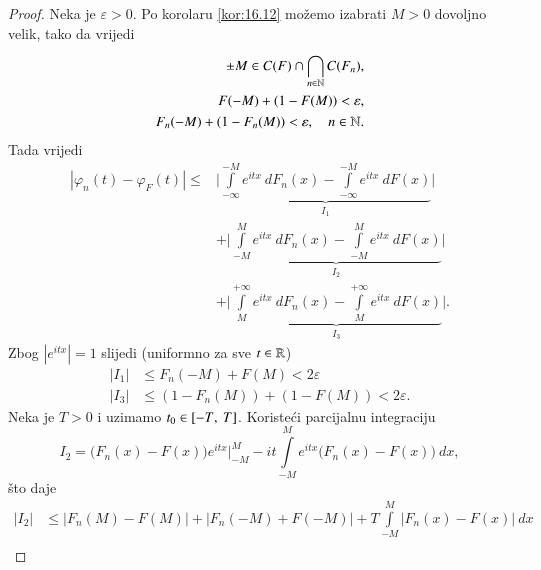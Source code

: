 \begin{proof}
    Neka je $\varepsilon > 0$.
    Po korolaru \ref{kor:16.12} mo\v zemo izabrati $M > 0$ dovoljno velik, tako da vrijedi
    \begin{equation*}
        \begin{aligned}
            \pm M \in C(F) \cap \bigcap\limits_{n \in \mathbb{N}}^{} C(F_n),\\
            F(-M) + (1 - F(M)) < \varepsilon,\\
            F_n (-M) + (1 - F_n (M)) < \varepsilon, \quad n \in \mathbb{N}.
        \end{aligned}
    \end{equation*}
    Tada vrijedi
    \begin{equation*}
        \begin{aligned}
            | \varphi_n (t) - \varphi_F (t) | \leq& \Big| \underbrace{\int\limits^{-M}_{-\infty} e^{itx} \: d F_n (x) - \int\limits_{-\infty}^{-M} e^{itx} \: d F (x) }_{I_1} \Big|\\
            &+ \Big| \underbrace{\int\limits_{-M}^{M} e^{itx} \: d F_n (x) - \int\limits_{-M}^{M} e^{itx} \: d F (x) }_{I_2} \Big|\\
            &+ \Big| \underbrace{\int\limits_{M}^{+\infty} e^{itx} \: d F_n (x) - \int\limits_{M}^{+\infty} e^{itx} \: d F (x) }_{I_3} \Big|.
        \end{aligned}
    \end{equation*}
    Zbog $|e^{itx}| = 1$ slijedi (uniformno za sve $t \in \mathbb{R}$)
    \begin{equation*}
        \begin{aligned}
            |I_1| &\leq F_n (-M) + F(M) < 2 \varepsilon\\
            |I_3| &\leq (1 - F_n(M)) + (1 - F (M)) < 2 \varepsilon.
        \end{aligned}
    \end{equation*}
    Neka je $T > 0$ i uzimamo $t_0 \in [{-T}, \:{T}]$.
    Koriste\' ci parcijalnu integraciju
    \begin{equation*}
        I_2 = \big( F_n(x) - F(x) \big) e^{itx} \Big|_{-M}^{M} - it \int\limits_{-M}^M e^{itx} \big( F_n (x) - F(x) \big) \: dx,
    \end{equation*}
    \v sto daje
    \begin{equation*}
        \begin{aligned}
            |I_2| &\leq |F_n(M) - F(M)| + |F_n(-M) + F(-M)| + T \int\limits_{-M}^{M} |F_n (x) - F (x)| \: dx\\

\end{aligned}
\end{equation*}
\end{proof}
